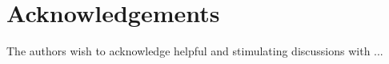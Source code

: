 \section*{Acknowledgements}

The authors wish to acknowledge helpful and stimulating discussions with ...